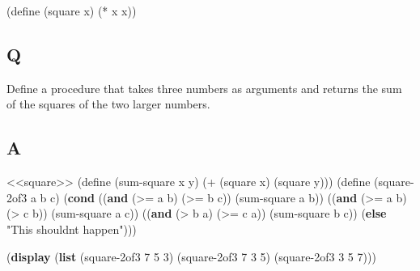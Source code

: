 \documentclass[
]{article}
\newenvironment{Shaded}{}{}
\newcommand{\DecValTok}[1]{\textcolor[rgb]{0.25,0.63,0.44}{#1}}
\newcommand{\ExtensionTok}[1]{#1}
\newcommand{\FunctionTok}[1]{\textcolor[rgb]{0.02,0.16,0.49}{#1}}
\newcommand{\KeywordTok}[1]{\textcolor[rgb]{0.00,0.44,0.13}{\textbf{#1}}}
\newcommand{\NormalTok}[1]{#1}
\newcommand{\OperatorTok}[1]{\textcolor[rgb]{0.40,0.40,0.40}{#1}}
\newcommand{\StringTok}[1]{\textcolor[rgb]{0.25,0.44,0.63}{#1}}
\begin{document}
\hypertarget{square}{%
\label{square}}%
\begin{Shaded}
\begin{Highlighting}[]
\NormalTok{(}\ExtensionTok{define}\FunctionTok{ }\NormalTok{(square x)}
\NormalTok{  (}\OperatorTok{*}\NormalTok{ x x))}
\end{Highlighting}
\end{Shaded}

\hypertarget{q-2}{%
\subsection{Q}\label{q-2}}

Define a procedure that takes three numbers as arguments and returns the
sum of the squares of the two larger numbers.

\hypertarget{a-2}{%
\subsection{A}\label{a-2}}

\hypertarget{EX1-3}{%
\label{EX1-3}}%
\begin{Shaded}
\begin{Highlighting}[numbers=left,,]
\NormalTok{\textless{}\textless{}square\textgreater{}\textgreater{}}
\NormalTok{(}\ExtensionTok{define}\FunctionTok{ }\NormalTok{(sum{-}square x y)}
\NormalTok{  (}\OperatorTok{+}\NormalTok{ (square x) (square y)))}
\NormalTok{(}\ExtensionTok{define}\FunctionTok{ }\NormalTok{(square{-}2of3 a b c)}
\NormalTok{  (}\KeywordTok{cond}\NormalTok{ ((}\KeywordTok{and}\NormalTok{ (}\OperatorTok{\textgreater{}=}\NormalTok{ a b) (}\OperatorTok{\textgreater{}=}\NormalTok{ b c)) (sum{-}square a b))}
\NormalTok{        ((}\KeywordTok{and}\NormalTok{ (}\OperatorTok{\textgreater{}=}\NormalTok{ a b) (}\OperatorTok{\textgreater{}}\NormalTok{ c b)) (sum{-}square a c))}
\NormalTok{        ((}\KeywordTok{and}\NormalTok{ (}\OperatorTok{\textgreater{}}\NormalTok{ b a) (}\OperatorTok{\textgreater{}=}\NormalTok{ c a)) (sum{-}square b c))}
\NormalTok{        (}\KeywordTok{else} \StringTok{"This shouldn\textquotesingle{}t happen"}\NormalTok{)))}

\NormalTok{(}\KeywordTok{display}
\NormalTok{ (}\KeywordTok{list}\NormalTok{ (square{-}2of3 }\DecValTok{7} \DecValTok{5} \DecValTok{3}\NormalTok{)}
\NormalTok{       (square{-}2of3 }\DecValTok{7} \DecValTok{3} \DecValTok{5}\NormalTok{)}
\NormalTok{       (square{-}2of3 }\DecValTok{3} \DecValTok{5} \DecValTok{7}\NormalTok{)))}

\end{Highlighting}
\end{Shaded}
\end{document}
